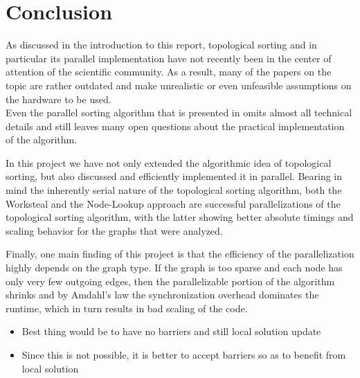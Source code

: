 \section{Conclusion}
%
As discussed in the introduction to this report, topological sorting and in particular its parallel implementation have not recently been in the center of attention of the scientific community.
As a result, many of the papers on the topic are rather outdated and make unrealistic or even unfeasible assumptions on the hardware to be used. \\
Even the parallel sorting algorithm that is presented in  \cite{er1983parallel} omits almost all technical details and still leaves many open questions about the practical implementation of the algorithm. 

In this project we have not only extended the algorithmic idea of topological sorting, but also discussed and efficiently implemented it in parallel.
Bearing in mind the inherently serial nature of the topological sorting algorithm, both the Worksteal and the Node-Lookup approach are successful parallelizations of the topological sorting algorithm, with the latter showing better absolute timings and scaling behavior for the graphs that were analyzed.

Finally, one main finding of this project is that the efficiency of the parallelization highly depends on the graph type. If the graph is too sparse and each node has only very few outgoing edges, then the parallelizable portion of the algorithm shrinks and by Amdahl's law the synchronization overhead dominates the runtime, which in turn results in bad scaling of the code.

\begin{invisible}
 \begin{itemize}
   \item Best thing would be to have no barriers and still local solution update
   \item Since this is not possible, it is better to accept barriers so as to benefit from local solution
 \end{itemize}
\end{invisible}
